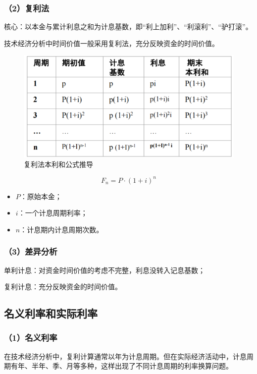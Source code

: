 \subsubsection{（2）复利法}

核心：以本金与累计利息之和为计息基数，即“利上加利”、“利滚利”、“驴打滚”。

技术经济分析中时间价值一般采用复利法，充分反映资金的时间价值。

\begin{figure}[H]
    \centering
    \includegraphics[width=0.9\linewidth]{image/复利法本利和公式推导.png}
    \caption{复利法本利和公式推导}
\end{figure}

$$F_n=P \cdot (1+i)^n$$

\begin{itemize}
    \item $P$：原始本金；
    \item $i$：一个计息周期利率；
    \item $n$：计息期内计息周期次数。
\end{itemize}

\subsubsection{（3）差异分析}
单利计息：对资金时间价值的考虑不完整，利息没转入记息基数；

复利计息：充分反映资金的时间价值。


\subsection{名义利率和实际利率}
\subsubsection{（1）名义利率}
在技术经济分析中，复利计算通常以年为计息周期。但在实际经济活动中，计息周期有年、半年、季、月等多种，这样出现了不同计息周期的利率换算问题。

